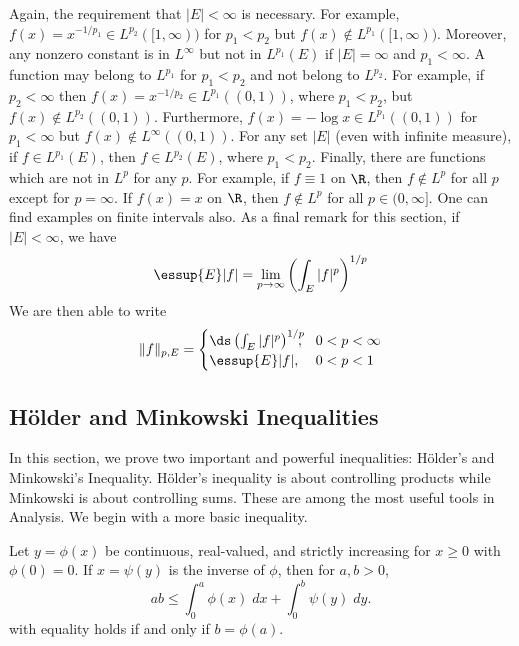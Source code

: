 Again, the requirement that $|E|<\infty$ is necessary. For example, $f(x)= x^{-1/p_1} \in L^{p_2}([1,\infty))$ for $p_1<p_2$ but $f(x) \notin L^{p_1}([1,\infty))$. Moreover, any nonzero constant is in $L^\infty$ but not in $L^{p_1}(E)$ if $|E|=\infty$ and $p_1<\infty$. A function may belong to $L^{p_1}$ for $p_1<p_2$ and not belong to $L^{p_2}$. For example, if $p_2<\infty$ then $f(x)= x^{-1/p_2} \in L^{p_1}((0,1))$, where $p_1<p_2$, but $f(x) \notin L^{p_2}((0,1))$. Furthermore, $f(x)= -\log x \in L^{p_1}((0,1))$ for $p_1<\infty$ but $f(x) \notin L^\infty((0,1))$. For any set $|E|$ (even with infinite measure), if $f \in L^{p_1}(E)$, then $f \in L^{p_2}(E)$, where $p_1<p_2$. Finally, there are functions which are not in $L^p$ for any $p$. For example, if $f \equiv 1$ on $\R$, then $f \notin L^p$ for all $p$ except for $p= \infty$. If $f(x)=x$ on $\R$, then $f \notin L^p$ for all $p \in (0,\infty]$. One can find examples on finite intervals also. As a final remark for this section, if $|E|< \infty$, we have
	\[
	\essup{E} |f|= \lim_{p \to \infty} \left( \int_E |f|^p \right)^{1/p}
	\]
We are then able to write 
	\[
	\|f\|_{p,E}=
	\begin{cases} 
	\ds\left( \int_E |f|^p\right)^{1/p} \!\!\!\!, & 0<p<\infty \\ 
	\essup{E} |f|, & 0<p<1 
	\end{cases}
	\]



\subsection{H\"older and Minkowski Inequalities}

In this section, we prove two important and powerful inequalities: H\"older's and Minkowski's Inequality. H\"older's inequality is about controlling products while Minkowski is about controlling sums. These are among the most useful tools in Analysis. We begin with a more basic inequality. 

\begin{thm}
Let $y= \phi(x)$ be continuous, real-valued, and strictly increasing for $x \geq 0$ with $\phi(0)=0$. If $x= \psi(y)$ is the inverse of $\phi$, then for $a,b>0$,
	\[
	ab \leq \int_0^a \phi(x) \; dx + \int_0^b \psi(y) \; dy.
	\]
with equality holds if and only if $b= \phi(a)$. 
\end{thm}

